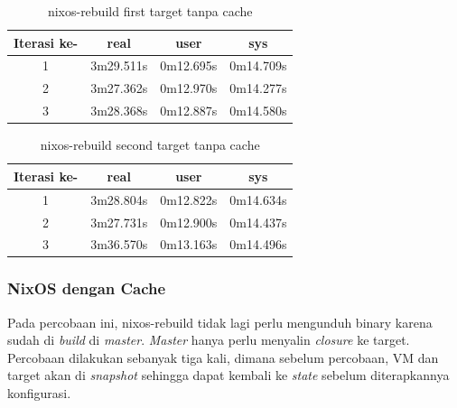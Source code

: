\documentclass[10pt,twoside]{report}
\begin{document}
\begin{adjustwidth}{20pt}{}
\begin{adjustwidth}{20pt}{}
	\end{adjustwidth}
	\begin{table}[H]
		\caption{nixos-rebuild first target tanpa cache}
		\begin{center}
			\begin{tabular}[c]{|c|c|c|c|}
				\hline
				\multicolumn{1}{|c|}{\textbf{Iterasi ke-}} &
				\multicolumn{1}{c|}{\textbf{real}}         &
				\multicolumn{1}{c|}{\textbf{user}}         &
				\multicolumn{1}{c|}{\textbf{sys}}                                              \\
				\hline
				1                                          & 3m29.511s & 0m12.695s & 0m14.709s \\
				\hline
				2                                          & 3m27.362s & 0m12.970s & 0m14.277s \\
				\hline
				3                                          & 3m28.368s & 0m12.887s & 0m14.580s \\
				\hline
			\end{tabular}
		\end{center}
	\end{table}
	\vspace{-5mm}
	\begin{table}[H]
		\caption{nixos-rebuild second target tanpa cache}
		\begin{center}
			\begin{tabular}[c]{|c|c|c|c|}
				\hline
				\multicolumn{1}{|c|}{\textbf{Iterasi ke-}} &
				\multicolumn{1}{c|}{\textbf{real}}         &
				\multicolumn{1}{c|}{\textbf{user}}         &
				\multicolumn{1}{c|}{\textbf{sys}}                                              \\
				\hline
				1                                          & 3m28.804s & 0m12.822s & 0m14.634s \\
				\hline
				2                                          & 3m27.731s & 0m12.900s & 0m14.437s \\
				\hline
				3                                          & 3m36.570s & 0m13.163s & 0m14.496s \\
				\hline
			\end{tabular}
		\end{center}
	\end{table}
	\subsubsection{NixOS dengan Cache}
	\begin{adjustwidth}{20pt}{}
		\hspace\parindent Pada percobaan ini, nixos-rebuild tidak lagi perlu mengunduh binary karena sudah
		di \textit{build} di \textit{master}. \textit{Master} hanya perlu menyalin \textit{closure}
		ke target. Percobaan dilakukan sebanyak tiga kali, dimana sebelum percobaan, VM
		dan target akan di \textit{snapshot} sehingga dapat kembali ke \textit{state}
		sebelum diterapkannya konfigurasi.


\end{adjustwidth}
\end{adjustwidth}
\end{document}
